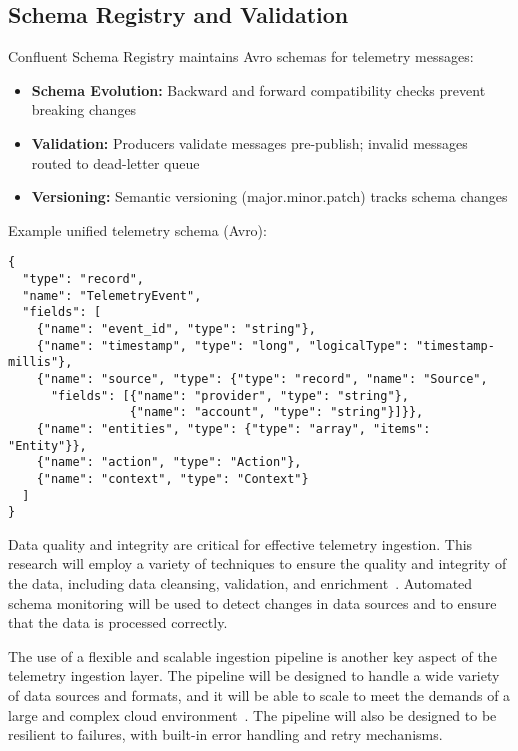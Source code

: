\subsection{Schema Registry and Validation}
Confluent Schema Registry maintains Avro schemas for telemetry messages:
\begin{itemize}
    \item \textbf{Schema Evolution:} Backward and forward compatibility checks prevent breaking changes
    \item \textbf{Validation:} Producers validate messages pre-publish; invalid messages routed to dead-letter queue
    \item \textbf{Versioning:} Semantic versioning (major.minor.patch) tracks schema changes
\end{itemize}

Example unified telemetry schema (Avro):
\begin{verbatim}
{
  "type": "record",
  "name": "TelemetryEvent",
  "fields": [
    {"name": "event_id", "type": "string"},
    {"name": "timestamp", "type": "long", "logicalType": "timestamp-millis"},
    {"name": "source", "type": {"type": "record", "name": "Source",
      "fields": [{"name": "provider", "type": "string"},
                 {"name": "account", "type": "string"}]}},
    {"name": "entities", "type": {"type": "array", "items": "Entity"}},
    {"name": "action", "type": "Action"},
    {"name": "context", "type": "Context"}
  ]
}
\end{verbatim}

Data quality and integrity are critical for effective telemetry ingestion. This research will employ a variety of techniques to ensure the quality and integrity of the data, including data cleansing, validation, and enrichment~\cite{siffletdata2024quality}. Automated schema monitoring will be used to detect changes in data sources and to ensure that the data is processed correctly.

The use of a flexible and scalable ingestion pipeline is another key aspect of the telemetry ingestion layer. The pipeline will be designed to handle a wide variety of data sources and formats, and it will be able to scale to meet the demands of a large and complex cloud environment~\cite{apica2024schema}. The pipeline will also be designed to be resilient to failures, with built-in error handling and retry mechanisms.

